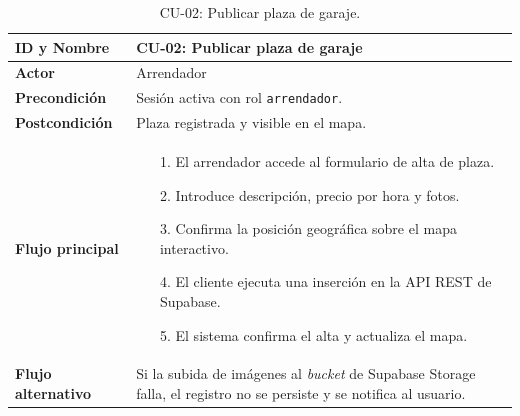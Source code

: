 \begin{table}[H]
  \centering
  \caption{CU-02: Publicar plaza de garaje.}
  \label{tab:cu-02}
  \begin{tabularx}{\textwidth}{|>{\columncolor{gray!15}\bfseries}l|X|}
    \hline
    ID y Nombre       & CU-02: Publicar plaza de garaje                                                                                             \\ \hline
    Actor             & Arrendador                                                                                                                  \\ \hline
    Precondición      & Sesión activa con rol \texttt{arrendador}.                                                                                  \\ \hline
    Postcondición     & Plaza registrada y visible en el mapa.                                                                                      \\ \hline
    Flujo principal   &
    \begin{itemize}[leftmargin=3mm, itemsep=0mm, topsep=1mm]
      \item[1.] El arrendador accede al formulario de alta de plaza.
      \item[2.] Introduce descripción, precio por hora y fotos.
      \item[3.] Confirma la posición geográfica sobre el mapa interactivo.
      \item[4.] El cliente ejecuta una inserción en la API REST de Supabase.
      \item[5.] El sistema confirma el alta y actualiza el mapa.
    \end{itemize}                                                                           \\ \hline
    Flujo alternativo & Si la subida de imágenes al \textit{bucket} de Supabase Storage falla, el registro no se persiste y se notifica al usuario. \\ \hline
  \end{tabularx}
\end{table}

